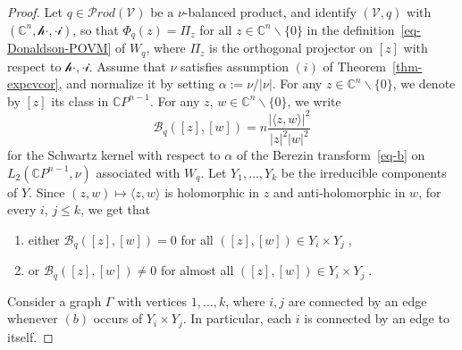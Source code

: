 \documentclass[11pt]{article}
\theoremstyle{definition}
\numberwithin{equation}{section}
\numberwithin{figure}{section}
\numberwithin{table}{section}
\newcommand{\CCC}{{\mathbb{C}}}
\newcommand{\cB}{{\mathcal{B}}}
\newcommand{\cV}{{\mathcal{V}}}
\renewcommand\leq {\leqslant}
\newcommand\< {\mathcal{h}}
\renewcommand\> {\mathcal{i}}
\newcommand{\Prod}{{\mathcal Prod}}
\newcommand*{\alphenumi}{\renewcommand*{\theenumi}{\alph{enumi}}}
\begin{document}
\begin{proof}
Let $q\in\Prod(\cV)$ be a $\nu$-balanced product, and identify $(\cV,q)$ with $(\CCC^n,\<\cdot,\cdot\>)$, so that $\Phi_q(z)=\Pi_z$ for all $z\in\CCC^n\backslash\{0\}$ in the definition~\eqref{eq-Donaldson-POVM} of $W_q$, where $\Pi_z$ is the orthogonal projector on $[z]$ with respect to $\<\cdot,\cdot\>$. Assume that $\nu$ satisfies assumption $(i)$ of Theorem~\ref{thm-expcvcor}, and normalize it by setting $\alpha:= \nu/|\nu|$. For any $z\in\CCC^n\backslash\{0\}$, we denote by $[z]$ its class in $\CCC P^{n-1}$. For any $z,\,w\in\CCC^n\backslash\{0\}$, we write
\begin{equation}
\cB_q([z],[w])= n\frac{|\langle z, w \rangle |^2} {|z|^2|w|^2}
\end{equation}
for the Schwartz kernel with respect to $\alpha$ of the Berezin transform~\eqref{eq-b} on\linebreak $L_2(\CCC P^{n-1},\nu)$ associated with $W_q$. Let $Y_1,\dots, Y_k$ be the irreducible components of $Y$. Since $(z,w) \mapsto \langle z, w\rangle$ is holomorphic in $z$ and anti-holomorphic in $w$, for every $i,\,j\leq k$, we get that
\begin{enumerate}\alphenumi
\item either $\cB_q([z],[w]) = 0$ for all $([z],[w])\in Y_i \times Y_j\;,$
\item or $\cB_q([z],[w])\neq 0$ for almost all $([z],[w])\in Y_i \times Y_j\;.$
\end{enumerate}
Consider a graph $\Gamma$ with vertices $1,\dots, k$, where $i,j$ are connected by an edge whenever $(b)$ occurs of $Y_i\times Y_j$. In particular, each $i$ is connected by an edge to itself.



\end{proof}
\end{document}

